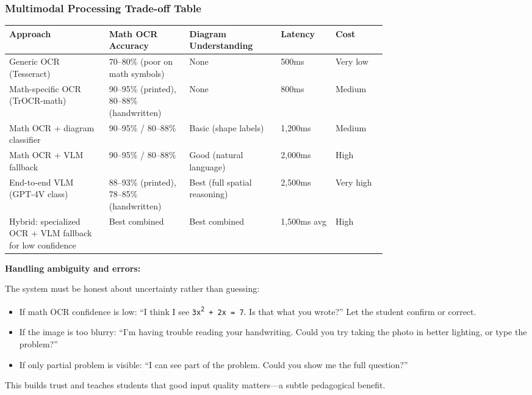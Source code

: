 \subsubsection*{Multimodal Processing Trade-off Table}

\begin{tabular}{|p{0.20\linewidth}|p{0.16\linewidth}|p{0.16\linewidth}|p{0.10\linewidth}|p{0.10\linewidth}|}
\hline
\textbf{Approach} & \textbf{Math OCR Accuracy} & \textbf{Diagram Understanding} & \textbf{Latency} & \textbf{Cost} \\
\hline
Generic OCR (Tesseract) & 70--80\% (poor on math symbols) & None & 500ms & Very low \\
\hline
Math-specific OCR (TrOCR-math) & 90--95\% (printed), 80--88\% (handwritten) & None & 800ms & Medium \\
\hline
Math OCR + diagram classifier & 90--95\% / 80--88\% & Basic (shape labels) & 1,200ms & Medium \\
\hline
Math OCR + VLM fallback & 90--95\% / 80--88\% & Good (natural language) & 2,000ms & High \\
\hline
End-to-end VLM (GPT-4V class) & 88--93\% (printed), 78--85\% (handwritten) & Best (full spatial reasoning) & 2,500ms & Very high \\
\hline
Hybrid: specialized OCR + VLM fallback for low confidence & Best combined & Best combined & 1,500ms avg & High \\
\hline
\end{tabular}

\textbf{Handling ambiguity and errors:}

The system must be honest about uncertainty rather than guessing:

\begin{itemize}
  \item If math OCR confidence is low: ``I think I see \texttt{3x\textsuperscript{2} + 2x = 7}. Is that what you wrote?'' Let the student confirm or correct.
  \item If the image is too blurry: ``I'm having trouble reading your handwriting. Could you try taking the photo in better lighting, or type the problem?''
  \item If only partial problem is visible: ``I can see part of the problem. Could you show me the full question?''
\end{itemize}

This builds trust and teaches students that good input quality matters---a subtle pedagogical benefit.

